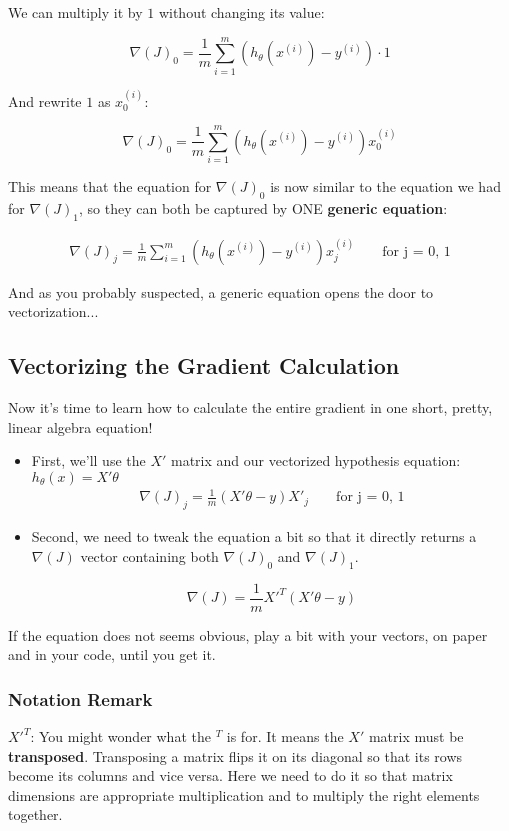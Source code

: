 We can multiply it by $1$ without changing its value:

$$
\nabla(J)_0 = \frac{1}{m}\sum_{i=1}^{m}(h_{\theta}(x^{(i)}) - y^{(i)}) \cdot 1
$$

And rewrite $1$ as $x_0^{(i)}$:

$$
\nabla(J)_0 = \frac{1}{m}\sum_{i=1}^{m}(h_{\theta}(x^{(i)}) - y^{(i)})x_{0}^{(i)}
$$

This means that the equation for $\nabla(J)_0$ is now similar to the equation we had for $\nabla(J)_1$, so they can both be captured by ONE \textbf{generic equation}:

$$
\begin{matrix}
\nabla(J)_j = \frac{1}{m}\sum_{i=1}^{m}(h_{\theta}(x^{(i)}) - y^{(i)})x_{j}^{(i)} & & \text{ for j = 0, 1}    
\end{matrix}
$$

And as you probably suspected, a generic equation opens the door to vectorization...

\subsection*{Vectorizing the Gradient Calculation}
Now it's time to learn how to calculate the entire gradient in one short, pretty, linear algebra equation!  
\begin{itemize}
    \item First, we'll use the $X'$ matrix and our vectorized hypothesis equation: $h_{\theta}(x)=X'\theta$
    $$
    \begin{matrix}
    \nabla(J)_j = \frac{1}{m} (X'\theta - y)X'_{j} & & \text{ for j = 0, 1}
    \end{matrix}
    $$
    
    \item Second, we need to tweak the equation a bit so that it directly returns a $\nabla(J)$ vector containing both $\nabla(J)_0$ and $\nabla(J)_1$.
    
    $$
    \nabla(J) = \frac{1}{m} {X'}^T(X'\theta - y)    
    $$
\end{itemize}

If the equation does not seems obvious, play a bit with your vectors, on paper and in your code, until you get it.

\subsubsection*{Notation Remark}
${X'}^T$: You might wonder what the $^T$ is for.
It means the $X'$ matrix must be \textbf{transposed}.
Transposing a matrix flips it on its diagonal so that its rows become its columns and vice versa.
Here we need to do it so that matrix dimensions are appropriate multiplication and to multiply the right elements together.